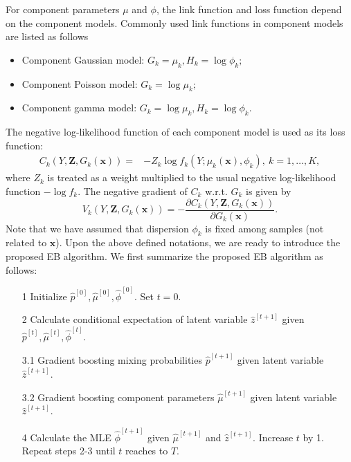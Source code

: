 \documentclass[11pt]{article}
\numberwithin{equation}{section}
\def\bx{\boldsymbol{x}}
\def\bZ{\boldsymbol{Z}}
\newcommand{\blue}[1]{\textcolor{blue}{#1}}
\begin{document}
For component parameters $\mu$ and $\phi$, the link function and loss function  depend on the component models.
Commonly used link functions in component models are listed as follows
	\begin{itemize}
		\item Component Gaussian model:
		$G_k=\mu_k, H_k=\log \phi_k;$
		\item Component Poisson model:
		$G_k=\log\mu_k;$
		\item Component gamma model:
				$G_k=\log \mu_k, H_k=\log \phi_k.$
	\end{itemize}
The negative log-likelihood function of each component model is used as its loss function:
	\begin{equation}
		\begin{aligned}
			{C_k(Y,\bZ,G_k(\bx))}=& -Z_k\log f_k(Y;\mu_k(\bx),\phi_k), ~ k=1,\ldots,K,
		\end{aligned}
	\end{equation}
where $Z_k$ is treated as a weight multiplied to the usual negative log-likelihood function $-\log f_k$.
	The negative gradient of $C_k$ w.r.t. $G_k$ is given by 
	$${V_k(Y,\bZ,G_k(\bx))}=-\frac{\partial C_k(Y,\bZ,G_k(\bx))}{\partial G_k(\bx)}.$$
	Note that we have assumed that dispersion $\phi_k$ is fixed among samples (not related to $\bx$). 
Upon the above defined notations, we are ready to introduce the proposed EB algorithm.
We first summarize the proposed EB algorithm as follows:
\begin{enumerate}
	\item[1] Initialize $\hat{p}^{[0]},\hat{\mu}^{[0]},\hat{\phi}^{[0]}$. Set $t=0$.
	\item[2] Calculate conditional expectation of latent variable $\hat{z}^{[t+1]}$ given $\hat{p}^{[t]},\hat{\mu}^{[t]},\hat{\phi}^{[t]}$.
	\item[3.1]  Gradient boosting mixing probabilities $\hat{p}^{[t+1]}$  given latent variable $\hat{z}^{[t+1]}$.
	\item[3.2] Gradient boosting component parameters $\hat{\mu}^{[t+1]}$ given latent variable $\hat{z}^{[t+1]}$.
	\item[4]  Calculate the MLE $\hat{\phi}^{[t+1]}$ given $\hat{\mu}^{[t+1]}$ and $\hat{z}^{[t+1]}$. Increase $t$ by 1. Repeat steps 2-3 until $t$ reaches to $T$.
\end{enumerate}
\end{document}
